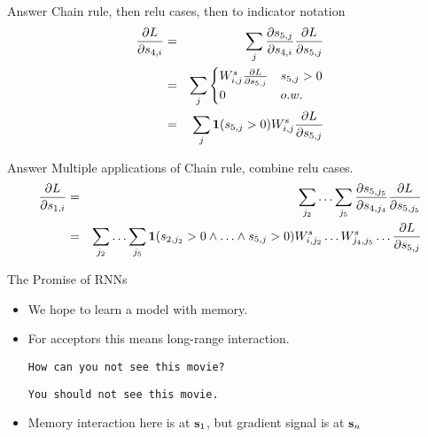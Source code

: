 \documentclass{beamer}
\begin{document}
\begin{frame}{Answer}
  Chain rule, then relu cases, then to indicator notation
  \begin{eqnarray*}
    \frac{\partial L}{\partial s_{4,i} } &=& \sum_{j} \frac{\partial s_{5,j}}{\partial s_{4,i}} \frac{\partial L}{\partial s_{5,j}} \\
     &=&  \sum_{j}
      \begin{cases}
        W^s_{i,j}  \frac{\partial L}{\partial s_{5, j}} &  s_{5, j} > 0\\
        0 &  o.w.\\
      \end{cases} \\
    &=& \sum_{j} \mathbf{1}(s_{5, j} > 0) W^s_{i,j}  \frac{\partial L}{\partial s_{5, j}} 
  \end{eqnarray*}
\end{frame}


\begin{frame}{Answer}
  Multiple applications of Chain rule, combine relu cases.
  \begin{eqnarray*}
    \frac{\partial L}{\partial s_{1,i}} &=& \sum_{j_2} \ldots \sum_{j_5} \frac{\partial s_{5,j_5}}{\partial s_{4,j_4}} \frac{\partial L}{\partial s_{5,j_5}}\\
    &=& \sum_{j_2} \ldots \sum_{j_5} \mathbf{1}(s_{2, j_2} > 0\land \ldots  \land s_{5, j} > 0) W^s_{i,j_2} \ldots W^s_{j_4,j_5}  \ldots  \frac{\partial L}{\partial s_{5, j}}  \\ 
  \end{eqnarray*}
\end{frame}

\begin{frame}{The Promise of RNNs}
  \begin{itemize}
  \item We hope to learn a model with memory.
    \air 
  \item For acceptors this means long-range interaction.

  \air 
  \texttt{How can you not see this movie?}
  \air 

  \texttt{You should not see this movie.}

\item Memory interaction here is at  $\mathbf{s}_1$, but gradient signal is at $\mathbf{s}_n$   
  \end{itemize}
\end{frame}
\end{document}
